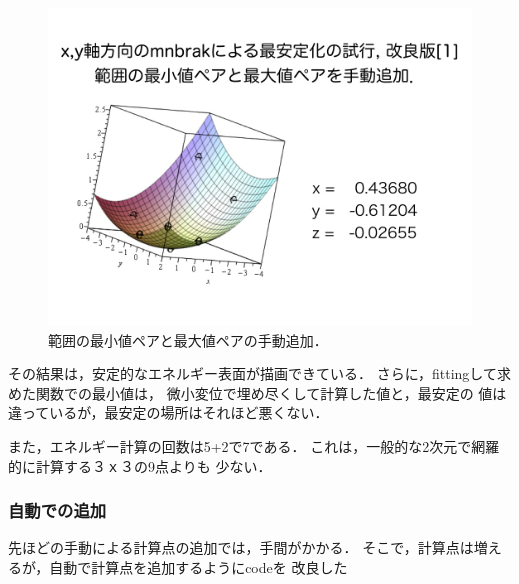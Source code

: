\documentclass[11pt,dvipdfmx]{jsarticle}
\begin{document}
\begin{figure}[H][htbp]
\centering
\begin{center}
\includegraphics[width=150mm]{../.././figs/thesis/thesis_009.jpeg}
\end{center}
\caption{範囲の最小値ペアと最大値ペアの手動追加．\label{spandata-label}}

\label{fig:}
\end{figure}

その結果は，安定的なエネルギー表面が描画できている．
さらに，fittingして求めた関数での最小値は，
微小変位で埋め尽くして計算した値と，最安定の
値は違っているが，最安定の場所はそれほど悪くない．

また，エネルギー計算の回数は5+2で7である．
これは，一般的な2次元で網羅的に計算する３ｘ３の9点よりも 少ない．

    \subsubsection{自動での追加}\label{ux81eaux52d5ux3067ux306eux8ffdux52a0}

先ほどの手動による計算点の追加では，手間がかかる．
そこで，計算点は増えるが，自動で計算点を追加するようにcodeを 改良した
\end{document}
